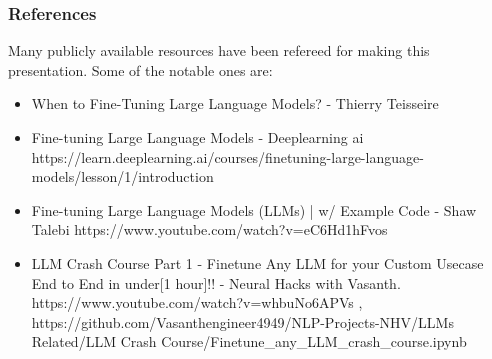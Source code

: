 \begin{frame}\frametitle{References}
Many publicly available resources have been refereed for making this presentation. Some of the notable ones are:
\footnotesize
\begin{itemize}
\item When to Fine-Tuning Large Language Models? - Thierry Teisseire
\item Fine-tuning Large Language Models - Deeplearning ai https://learn.deeplearning.ai/courses/finetuning-large-language-models/lesson/1/introduction
\item Fine-tuning Large Language Models (LLMs) | w/ Example Code - Shaw Talebi https://www.youtube.com/watch?v=eC6Hd1hFvos
\item LLM Crash Course Part 1 - Finetune Any LLM for your Custom Usecase End to End in under[1 hour]!! - Neural Hacks with Vasanth. https://www.youtube.com/watch?v=whbuNo6APVs  ,  https://github.com/Vasanthengineer4949/NLP-Projects-NHV/LLMs Related/LLM Crash Course/Finetune\_any\_LLM\_crash\_course.ipynb
\end{itemize}

\end{frame}
